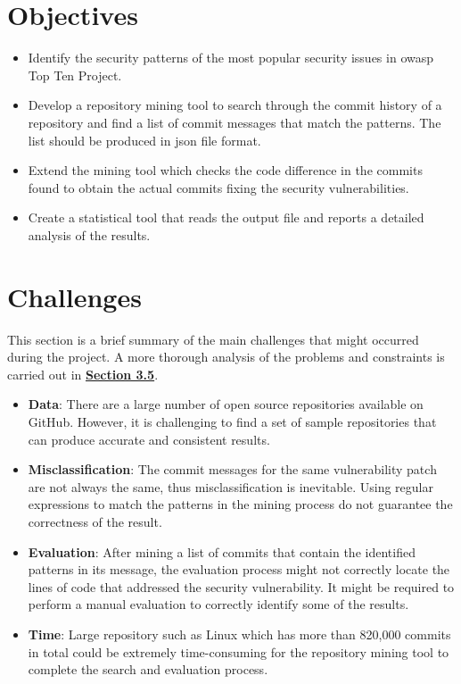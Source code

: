 \documentclass[12pt, a4paper]{report}
\begin{document}
\section{Objectives} \label{sec:objectives}
\begin{itemize}
	\item Identify the security patterns of the most popular security issues in \acrfull{owasp} Top
	Ten Project.
	\item Develop a repository mining tool to search through the commit history of a repository and
	find a list of commit messages that match the patterns. The list should be produced in
	\acrfull{json} file format.
	\item Extend the mining tool which checks the code difference in the commits found to obtain the
  actual commits fixing the security vulnerabilities.
  \item Create a statistical tool that reads the output file and reports a detailed analysis of the
  results.
\end{itemize}

\section{Challenges} \label{sec:challenges}
This section is a brief summary of the main challenges that might occurred during the project. A
more thorough analysis of the problems and constraints is carried out in
\hyperref[sec:problems_and_constraints]{\textbf{Section 3.5}}.

\begin{itemize}
	\item \textbf{Data}: There are a large number of open source repositories available on GitHub.
	However, it is challenging to find a set of sample repositories that can produce accurate and
	consistent results.
	\item \textbf{Misclassification}: The commit messages for the same vulnerability patch are not
	always the same, thus misclassification is inevitable. Using regular expressions to match the
	patterns in the mining process do not guarantee the correctness of the result.
	\item \textbf{Evaluation}: After mining a list of commits that contain the identified patterns in
	its message, the evaluation process might not correctly locate the lines of code that addressed
	the security vulnerability. It might be required to perform a manual evaluation to correctly
	identify some of the results.
	\item \textbf{Time}: Large repository such as Linux which has more than 820,000 commits in total
	\cite{linux_repo} could be extremely time-consuming for the repository mining tool to complete the
	search and evaluation process.
\end{itemize}
\end{document}
